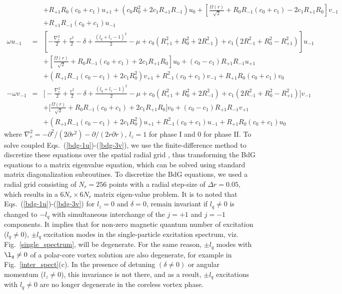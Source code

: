 \documentclass[pra,twocolumn,aps,superscriptaddress,showpacs,longbibliography]{revtex4-1}
\begin{document}
\begin{widetext}
\begin{subequations}
\begin{eqnarray}
  && + R_{+1}R_0(c_0+c_1)u_{+1}+(c_0R_0^2+2c_1R_{+1}R_{-1})u_{0}+\left[\frac{\Omega(r)}{\sqrt{2}}+R_0R_{-1}(c_0+c_1)-2c_1R_{+1}R_0 \right]v_{-1}  \nonumber \\ && + R_{+1}R_{-1}(c_0+c_1)u_{-1}\label{bdg-2v} \\
\omega u_{-1}   &=&
 \left[-\frac{\nabla^2_r}{2} +\frac{r^2}{2}- \delta+ \frac{(l_q+l_z-1)^2}{2}-\mu+c_0 (R_{+1}^2 +R_0^2+2R_{-1}^2)+ c_1(2R_{-1}^2+R_0^2-R_{+1}^2)\right]u_{-1} \nonumber \\&&+\left[\frac{\Omega(r)}{\sqrt{2}} 
+R_0R_{-1}(c_0+c_1)+2c_1R_{+1}R_0\right]u_0 + (c_0-c_1)R_{+1}R_{-1} u_{+1} \nonumber \\&& + (R_{+1}R_{-1}(c_0-c_1)+2c_1R_{0}^2)v_{+1} +R_{-1}^2(c_0+c_1)v_{-1}+ R_{+1} R_0(c_0+c_1) v_0
  \label{bdg-3u} \\
-\omega v_{-1}   &=&
 \big[-\frac{\nabla^2_r}{2} +\frac{r^2}{2}- \delta+ \frac{(l_q+l_z-1)^2}{2}-\mu+c_0 (R_{+1}^2 +R_0^2+2R_{-1}^2)+ c_1(2R_{-1}^2+R_0^2-R_{+1}^2)\big]v_{-1} \nonumber\\&& 
+\big[\frac{\Omega(r)}{\sqrt{2}} 
 +R_0R_{-1}(c_0+c_1)+ 2c_1R_{+1}R_0\big]v_{0} + (c_0-c_1)R_{+1}R_{-1} v_{+1}\nonumber\\&&
 + (R_{+1}R_{-1}(c_0-c_1)+2c_1R_0^2)u_{+1} +R_{-1}^2(c_0+c_1)u_{-1}+ R_{+1} R_0(c_0+c_1) u_0
  \label{bdg-3v} 
 \end{eqnarray}
\end{subequations}
where $\nabla^2_r = -\partial^2/(2\partial r^2)-{\partial}/(2 r\partial r)$, $l_z = 1$ for phase I and $0$ for phase II. 
To solve coupled Eqs.~(\ref{bdg-1u})-(\ref{bdg-3v}), we use
the finite-difference method to discretize these equations over the spatial radial grid \cite{GAO2020109058}, thus transforming the
BdG equations to a matrix eigenvalue equation, which can be solved using 
standard matrix diagonalization subroutines. To discretize the BdG equations, we used a radial grid consisting of 
$N_r = 256$ points with a radial step-size of $\Delta r = 0.05$, which results in a $6N_r\times 6N_r$ matrix eigen-value problem.
It is to noted that Eqs.~(\ref{bdg-1u})-(\ref{bdg-3v}) for $l_z = 0$ and $\delta = 0$, remain invariant if $l_q\ne 0$ is changed to $-l_q$ with simultaneous interchange of the $j = +1$ and $j = -1$ components. It implies that for non-zero magnetic quantum number of excitation ($l_q\ne 0$), 
$\pm l_q$ excitation modes in the single-particle excitation spectrum, viz. Fig.~\ref{single_spectrum}, will be degenerate.
For the same reason, $\pm l_q$ modes with $\l_q\ne 0$ of a polar-core vortex solution are also degenerate, for example in Fig.~\ref{inter_spect}(c).
In the presence of detuning $(\delta \ne 0)$ or angular momentum ($l_z\ne 0$), this invariance is not there, and as a result, $\pm l_q$ excitations with $l_q\ne 0$
are no longer degenerate in the coreless vortex phase.


\end{widetext}
{}

\end{document}

